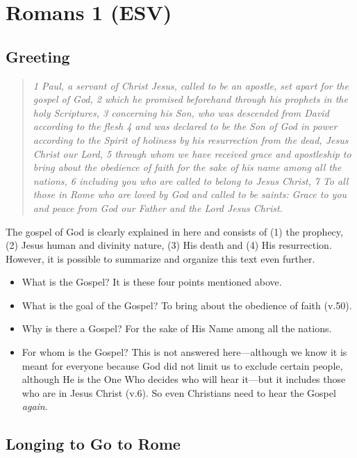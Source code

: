 \hypertarget{romans-1-esv}{%
\section{Romans 1 (ESV)}\label{romans-1-esv}}
\vspace{10.5cm}
\subsection{Greeting} 

\begin{quote}
\emph{1 Paul, a servant of Christ Jesus, called to be
an apostle, set apart for the gospel of God, 2 which he promised
beforehand through his prophets in the holy Scriptures, 3 concerning his
Son, who was descended from David according to the flesh 4 and was
declared to be the Son of God in power according to the Spirit of
holiness by his resurrection from the dead, Jesus Christ our Lord, 5
through whom we have received grace and apostleship to bring about the
obedience of faith for the sake of his name among all the nations, 6
including you who are called to belong to Jesus Christ,} \emph{7 To all
those in Rome who are loved by God and called to be saints:} \emph{Grace
to you and peace from God our Father and the Lord Jesus Christ.}
\end{quote}

The gospel of God is clearly explained in here and consists of (1) the
prophecy, (2) Jesus human and divinity nature, (3) His death and (4) His
resurrection. However, it is possible to summarize and organize this
text even further. 
\begin{itemize}
    \item What is the Gospel? It is these four points
mentioned above.
\item What is the goal of the Gospel? To bring about the
obedience of faith (v.50). 
\item Why is there a Gospel? For the sake of His
Name among all the nations. 
\item For whom is the Gospel? This is not answered here---although we know it is meant for everyone because God did not limit us to exclude certain people, although He is the One Who decides who will hear it---but it includes those who are in Jesus Christ
(v.6). So even Christians need to hear the Gospel \emph{again}.
\end{itemize}

\subsection{Longing to Go to Rome} 

